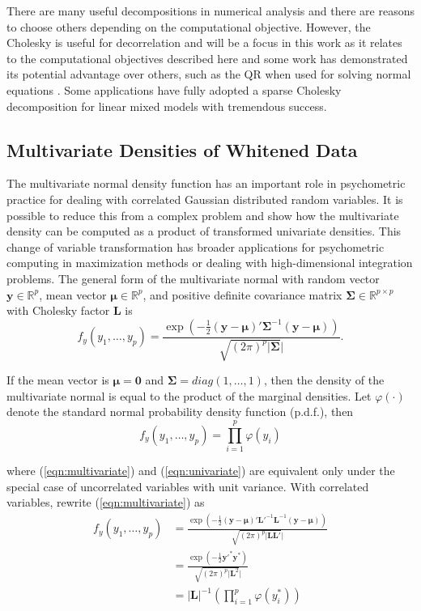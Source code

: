 \documentclass[12pt]{article}
\begin{document}
There are many useful decompositions in numerical analysis \cite{searle:1982,zhang:matrix} and there are reasons to choose others depending on the computational objective. However, the Cholesky is useful for decorrelation and will be a focus in this work as it relates to the computational objectives described here and some work has demonstrated its potential advantage over others, such as the QR when used for solving normal equations \cite{qr:chol}. Some applications have fully adopted a sparse Cholesky decomposition \cite{tim:davis} for linear mixed models \cite{JSSv067i01} with tremendous success.  

\subsection*{Multivariate Densities of Whitened Data}

The multivariate normal density function has an important role in psychometric practice for dealing with correlated Gaussian distributed random variables. It is possible to reduce this from a complex problem and show how the multivariate density can be computed as a product of transformed univariate densities. This change of variable transformation has broader applications for psychometric computing in maximization methods or dealing with high-dimensional integration problems. The general form of the multivariate normal with random vector $\bm{y}\in \mathbb{R}^p$, mean vector $\bm{\mu} \in \mathbb{R}^p$, and positive definite covariance matrix $\bm{\Sigma} \in \mathbb{R}^{p \times p}$ with Cholesky factor $\bm{L}$ is
\begin{equation}
\label{eqn:multivariate}
f_y(y_1, \ldots, y_p)  =  \frac{\exp(-\frac{1}{2}(\bm{y} - \bm{\mu})'\bm{\Sigma}^{-1}(\bm{y} - \bm{\mu}))}{\sqrt{(2\pi)^p|\bm{\Sigma}}|}.
\end{equation}

\noindent If the mean vector is $\bm{\mu} = \bm{0}$ and $\bm{\Sigma} = diag(1, \ldots, 1)$, then the density of the multivariate normal is equal to the product of the marginal densities. Let $\varphi(\cdot)$ denote the standard normal probability density function (p.d.f.), then
\begin{equation}
\label{eqn:univariate}
f_y(y_1, \ldots, y_p)  =  \prod_{i=1}^p\varphi(y_i)
\end{equation}

\noindent where (\ref{eqn:multivariate}) and (\ref{eqn:univariate}) are equivalent only under the special case of uncorrelated variables with unit variance. With correlated variables, rewrite (\ref{eqn:multivariate}) as
\begin{align}
\label{eqn:multivariate2}
f_y(y_1, \ldots, y_p)  & =  \frac{\exp(-\frac{1}{2}(\bm{y} - \bm{\mu})'\bm{L}'^{-1}\bm{L}^{-1}(\bm{y} - \bm{\mu}))}{\sqrt{(2\pi)^p|\bm{L}\bm{L}'}|}\\
				&=  \frac{\exp(-\frac{1}{2}\bm{y}'^{*}\bm{y}^{*}  )}{\sqrt{(2\pi)^p|\bm{L}^2}|} \label{eqn:multivariate3.1}\\
				& =  |\bm{L}|^{-1}\left(\prod_{i=1}^p\varphi(y^*_i)\right) \label{eqn:multivariate3.2}
\end{align}
\end{document}
